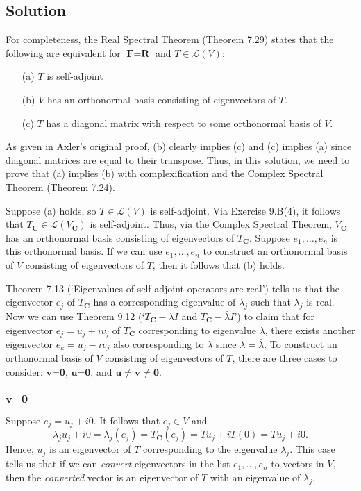 \documentclass{article}
\begin{document}
\subsection*{Solution}
For completeness, the Real Spectral Theorem (Theorem 7.29) states that the following are equivalent for $\textbf{F}=\textbf{R}$ and $T\in\mathcal{L}(V)$:
\begin{enumerate}
  \item[(a)] $T$ is self-adjoint
  \item[(b)] $V$ has an orthonormal basis consisting of eigenvectors of $T$.
  \item[(c)] $T$ has a diagonal matrix with respect to some orthonormal basis of $V$.
\end{enumerate}
As given in Axler's original proof, (b) clearly implies (c) and (c) implies (a) since diagonal matrices are equal to their transpose. 
Thus, in this solution, we need to prove that (a) implies (b) with complexification and the Complex Spectral Theorem (Theorem 7.24).

Suppose (a) holds, so $T\in\mathcal{L}(V)$ is self-adjoint. 
Via Exercise 9.B(4), it follows that $T_{\textbf{C}}\in\mathcal{L}(V_{\textbf{C}})$ is self-adjoint. 
Thus, via the Complex Spectral Theorem, $V_{\textbf{C}}$ has an orthonormal basis consisting of eigenvectors of $T_{\textbf{C}}$. 
Suppose $e_1,\ldots,e_n$ is this orthonormal basis. 
If we can use $e_1,\ldots,e_n$ to construct an orthonormal basis of $V$ consisting of eigenvectors of $T$, then it follows that (b) holds.

Theorem 7.13 (`Eigenvalues of self-adjoint operators are real') tells us that the eigenvector $e_j$ of $T_{\textbf{C}}$ has a corresponding eigenvalue of $\lambda_j$ such that $\lambda_j$ is real. 
Now we can use Theorem 9.12 (`$T_{\textbf{C}}-\lambda I$ and $T_{\textbf{C}}-\bar{\lambda} I$') to claim that for eigenvector $e_j=u_j+iv_j$ of $T_{\textbf{C}}$ corresponding to eigenvalue $\lambda$, there exists another eigenvector $e_k=u_j-iv_j$ also corresponding to $\lambda$ since $\lambda=\bar{\lambda}$. 
To construct an orthonormal basis of $V$ consisting of eigenvectors of $T$, there are three cases to consider: $\textbf{v=0}$, $\textbf{u=0}$, and $\textbf{u}\neq\textbf{v}\neq\textbf{0}$.

\subsubsection*{$\textbf{v=0}$}
Suppose $e_j=u_j+i0$. It follows that $e_j\in V$ and 
\[\lambda_ju_j+i0=\lambda_j(e_j)=T_{\mathbf{C}}(e_j)=Tu_j+iT(0)=Tu_j+i0.\]
Hence, $u_j$ is an eigenvector of $T$ corresponding to the eigenvalue $\lambda_j$. 
This case tells us that if we can \textit{convert} eigenvectors in the list $e_1,\ldots,e_n$ to vectors in $V$, then the \textit{converted} vector is an eigenvector of $T$ with an eigenvalue of $\lambda_j$.
\end{document}
